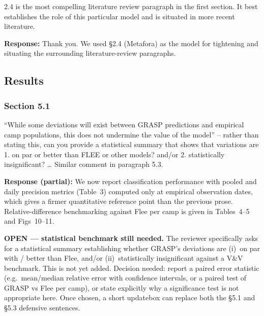 \documentclass[11pt,a4paper]{article}
\begin{document}
\begin{reviewbox}
2.4 is the most compelling literature review paragraph in the first section. It best establishes the role of this particular model and is situated in more recent literature.
\end{reviewbox}

\textbf{Response:} Thank you. We used §2.4 (Metafora) as the model for tightening and situating the surrounding
literature-review paragraphs.

\subsection*{Results}

\subsubsection*{Section 5.1}

\begin{reviewbox}
``While some deviations will exist between GRASP predictions and empirical camp populations, this does not undermine the value of the model'' -- rather than stating this, can you provide a statistical summary that shows that variations are 1. on par or better than FLEE or other models? and/or 2. statistically insignificant? \ldots{} Similar comment in paragraph 5.3.
\end{reviewbox}

\textbf{Response (partial):} We now report classification performance with pooled and daily precision metrics
(Table~3) computed only at empirical observation dates, which gives a firmer quantitative reference point than the
previous prose. Relative-difference benchmarking against Flee per camp is given in Tables~4--5 and Figs~10--11.

\vspace{0.3cm}
\begin{flagbox}
\textbf{OPEN --- statistical benchmark still needed.} The reviewer specifically asks for a statistical summary
establishing whether GRASP's deviations are (i)~on par with / better than Flee, and/or (ii)~statistically
insignificant against a V\&V benchmark. This is not yet added. Decision needed: report a paired error statistic
(e.g.\ mean/median relative error with confidence intervals, or a paired test of GRASP vs Flee per camp), or
state explicitly why a significance test is not appropriate here. Once chosen, a short updatebox can replace both
the §5.1 and §5.3 defensive sentences.
\end{flagbox}
\end{document}
